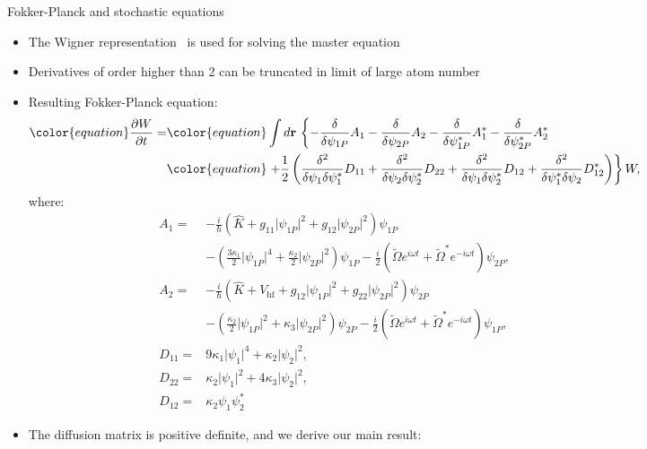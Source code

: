 \documentclass[final,hyperref={pdfpagelabels=false}]{beamer}
\begin{document}
\begin{frame}
\begin{columns}
{\begin{block}{Fokker-Planck and stochastic equations}
\begin{itemize}
	\item The Wigner representation~\cite{gardiner} is used for solving the master equation
	\item Derivatives of order higher than 2 can be truncated in limit of large atom number~\cite{norrie, sinatra}
	\item Resulting Fokker-Planck equation:
\begin{equation*}
\begin{split}\color{equation}
\frac{\partial W}{\partial t} = &\color{equation} \int d\mathbf{r}\, \left\{
	- \frac{\delta}{\delta \psi_{1P}} A_1 -
	\frac{\delta}{\delta \psi_{2P}} A_2 -
	\frac{\delta}{\delta \psi^*_{1P}} A^*_1 -
	\frac{\delta}{\delta \psi^*_{2P}} A^*_2
\right. \\
&\color{equation} \left. + \frac{1}{2} \left(
	\frac{\delta^2}{\delta \psi_1 \delta \psi_1^*} D_{11} +
	\frac{\delta^2}{\delta \psi_2 \delta \psi_2^*} D_{22} +
	\frac{\delta^2}{\delta \psi_1 \delta \psi_2^*} D_{12} +
	\frac{\delta^2}{\delta \psi_1^* \delta \psi_2} D^*_{12} \right)
\right\} W,
\end{split}
\end{equation*}
where:
\begin{align*}
 A_1 = {} & -\frac{i}{\hbar} \left( \hat{K} + g_{11} \lvert \psi_{1P} \rvert^2 + g_{12} \lvert \psi_{2P} \rvert^2 \right) \psi_{1P} \\
	& - \left( \frac{3 \kappa_1}{2} \lvert \psi_{1P} \rvert^4 + \frac{\kappa_2}{2} \lvert \psi_{2P} \rvert^2 \right) \psi_{1P} -
	\frac{i}{2} \left( \tilde{\Omega} e^{i \omega t} + \tilde{\Omega}^* e^{-i \omega t} \right) \psi_{2P}, \\
A_2 = {} & -\frac{i}{\hbar} \left( \hat{K} + V_{\textrm{hf}} +
	g_{12} \lvert \psi_{1P} \rvert^2 + g_{22} \lvert \psi_{2P} \rvert^2 \right) \psi_{2P} \\
	& - \left( \frac{\kappa_2}{2} \lvert \psi_{1P} \rvert^2 + \kappa_3 \lvert \psi_{2P} \rvert^2 \right) \psi_{2P} -
	\frac{i}{2} \left( \tilde{\Omega} e^{i \omega t} + \tilde{\Omega}^* e^{-i \omega t} \right) \psi_{1P}, \\
D_{11} = {} & 9 \kappa_1 \lvert \psi_1 \rvert^4 + \kappa_2 \lvert \psi_2 \rvert^2, \\
D_{22} = {} & \kappa_2 \lvert \psi_1 \rvert^2 + 4 \kappa_3 \lvert \psi_2 \rvert^2, \\
D_{12} = {} & \kappa_2 \psi_1 \psi_2^*
\end{align*}
	\item The diffusion matrix is positive definite, and we derive our main result:

\end{itemize}
\end{block}}
\end{columns}
\end{frame}
\end{document}
